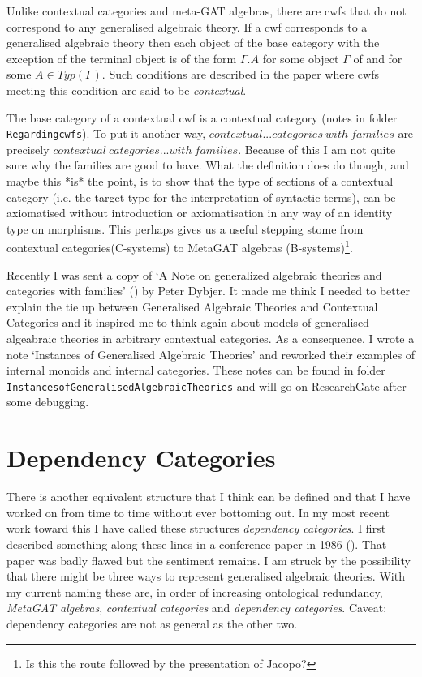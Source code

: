 \documentclass[10pt,a4paper]{article}
\theoremstyle{remark}
\begin{document}
\note
Unlike contextual categories and meta-GAT algebras, there are cwfs that do not correspond to
any generalised algebraic theory. If a cwf corresponds to a generalised algebraic theory then each object of the base category \catcw with the exception of the terminal object is of the form $\Gamma.A$ for some object $\Gamma$ of \catcw and for some $A \in Typ(\Gamma)$. Such conditions are described in the paper \cite{CastellanClairambaultDybjer2019}
where cwfs meeting this condition are said to be \textit{contextual}.

\note The base category of a  contextual cwf is a contextual category (notes in folder \verb!Regardingcwfs!). 
To put it another way, $contextual ... categories\  with\  families$ are precisely $contextual\ categories...with\ families$. Because of this
I am not quite sure why the families are good to have. What the definition does do though, and maybe this *is* the point, is to show that the type of sections of a contextual category (i.e. the target type for the interpretation of syntactic terms), can be axiomatised without introduction
or axiomatisation in any way of an identity type on morphisms. This perhaps gives us a useful stepping stome from contextual categories(C-systems) 
to MetaGAT algebras (B-systems)\footnote{Is this the route followed by the presentation of Jacopo?}.

\note Recently I was sent a copy of  `A Note on generalized algebraic theories and categories with families' (\cite{BCDEpaper}) by Peter Dybjer. It made me think I needed to better explain the tie up between 
Generalised Algebraic Theories and Contextual Categories and it inspired me to think again about models of generalised algeabraic theories in arbitrary contextual categories. As a consequence, I wrote a note `Instances of Generalised Algebraic Theories' and reworked their examples of
internal monoids and internal categories.
These notes can be found in folder \verb!InstancesofGeneralisedAlgebraicTheories! and will go on ResearchGate after some debugging.


\section{Dependency Categories }

\note 
There is another equivalent structure that I think can be defined and that I have worked on from time to time without ever bottoming out. In my most recent work toward this I have called these
structures \textit{dependency categories}.  
I first described something along these lines in a conference paper in 1986 (\cite{CartmellNetworkDataModel}). That paper was badly flawed  but the sentiment remains. 
\note
I am struck by the possibility that there might be three ways to represent generalised algebraic theories.
With my current naming these are, in order of increasing ontological redundancy, \textit{MetaGAT algebras}, \textit{contextual categories} and
\textit{dependency categories}.  Caveat:  dependency categories are not  as general as the other two.
\end{document}
